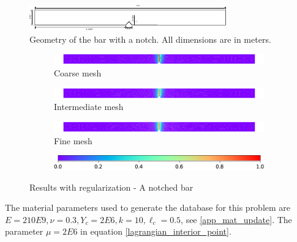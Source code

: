 \documentclass[10pt]{elsarticle}
\begin{document}
\begin{figure}
	\centering
	\includegraphics[width=\linewidth]{./Images/2d_1d_bar/2d_1d_bar.pdf}
	\caption{Geometry of the bar with a notch. All dimensions are in meters.}
	\label{2d_1d_bar_dims}
\end{figure}


\begin{figure}[ht]
	\begin{subfigure}{\textwidth}
		\centering
		\includegraphics[width=\linewidth]{./Images/2d_1d_bar/damage_coarse.pdf}
		\caption{Coarse mesh}
		\label{2d_1d_bar_damage_coarse}
	\end{subfigure}
	\begin{subfigure}{\textwidth}
		\centering
		\includegraphics[width=\linewidth]{./Images/2d_1d_bar/damage_inter.pdf}
		\caption{Intermediate mesh}
		\label{2d_1d_bar_damage_inter}
	\end{subfigure}
	\begin{subfigure}{\textwidth}
		\centering
		\includegraphics[width=\linewidth]{./Images/2d_1d_bar/damage_fine.pdf}
		\caption{Fine mesh}
		\label{2d_1d_bar_damage_fine}
	\end{subfigure}
	\begin{subfigure}{\textwidth}
		\centering
		\vfill
		\includegraphics[width=0.4\linewidth]{./Images/2d_1d_bar/cb.pdf}
	\end{subfigure}
	\caption{Results with regularization - A notched bar}
	\label{2d_1d_bar_damage}
\end{figure}

The material parameters used to generate the database for this problem are $E = 210E9, \nu = 0.3, Y_c = 2E6, k=10, \ell_c = 0.5$, see \ref{app_mat_update}. The parameter $\mu = 2E6$ in equation \ref{lagrangian_interior_point}.
\end{document}

